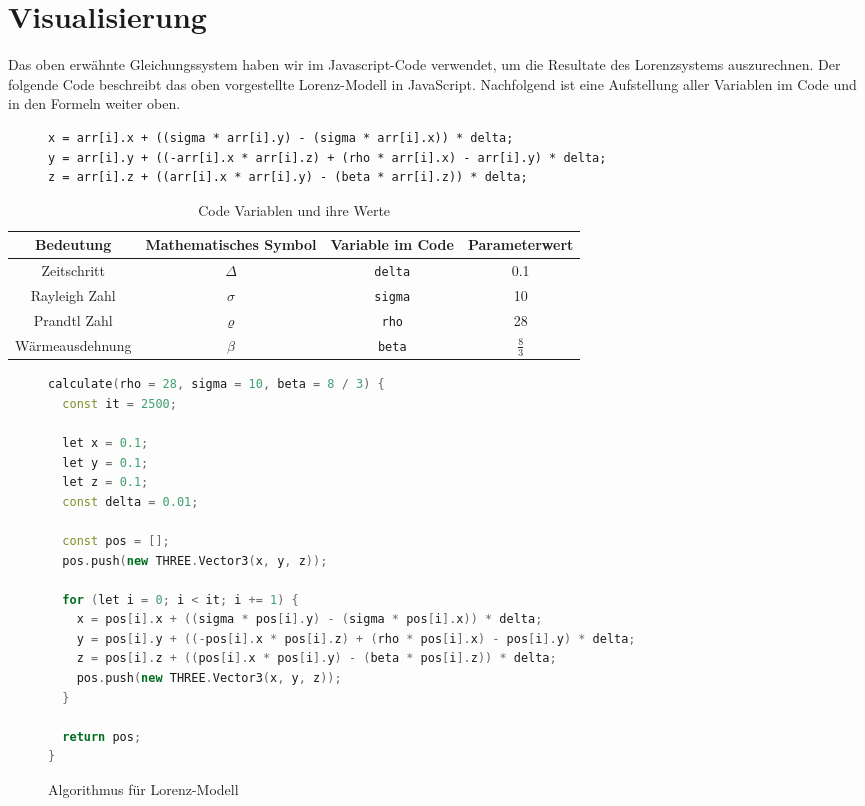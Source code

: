 
\section{Visualisierung}\label{visualisierung}
Das oben erwähnte Gleichungssystem haben wir im Javascript-Code verwendet, um die Resultate des Lorenzsystems auszurechnen. Der folgende Code beschreibt das oben vorgestellte Lorenz-Modell in JavaScript. Nachfolgend ist eine Aufstellung aller Variablen im Code und in den Formeln weiter oben.

\begin{figure}
	\begin{lstlisting}[style=C]
x = arr[i].x + ((sigma * arr[i].y) - (sigma * arr[i].x)) * delta;
y = arr[i].y + ((-arr[i].x * arr[i].z) + (rho * arr[i].x) - arr[i].y) * delta;
z = arr[i].z + ((arr[i].x * arr[i].y) - (beta * arr[i].z)) * delta;
		\end{lstlisting}
\end{figure}

	\begin{table}[]
		\centering
		\begin{tabular}{| c | c | c | c |}
			\hline
			\textbf{Bedeutung} & \textbf{Mathematisches Symbol} & \textbf{Variable im Code} & \textbf{Parameterwert}\\\hline
			Zeitschritt & $ \Delta $ & \texttt{delta} & 0.1 \\\hline
			Rayleigh Zahl & $ \sigma $ & \texttt{sigma} & 10 \\\hline
			Prandtl Zahl & $\varrho $ & \texttt{rho} & 28 \\\hline
			Wärmeausdehnung & $\beta $ & \texttt{beta}  & $ \frac{8}{3} $ \\\hline
		\end{tabular}
		\caption{Code Variablen und ihre Werte\label{CodeVariablen}}
	\end{table}

\begin{figure}
	\begin{lstlisting}[style=C, language=C++]
calculate(rho = 28, sigma = 10, beta = 8 / 3) {
  const it = 2500;

  let x = 0.1;
  let y = 0.1;
  let z = 0.1;
  const delta = 0.01;

  const pos = [];
  pos.push(new THREE.Vector3(x, y, z));

  for (let i = 0; i < it; i += 1) {
	x = pos[i].x + ((sigma * pos[i].y) - (sigma * pos[i].x)) * delta;
	y = pos[i].y + ((-pos[i].x * pos[i].z) + (rho * pos[i].x) - pos[i].y) * delta;
	z = pos[i].z + ((pos[i].x * pos[i].y) - (beta * pos[i].z)) * delta;
	pos.push(new THREE.Vector3(x, y, z));
  }

  return pos;
}
		\end{lstlisting}
		\caption{Algorithmus für Lorenz-Modell\label{AlgorithmusLorenz}}
\end{figure}

